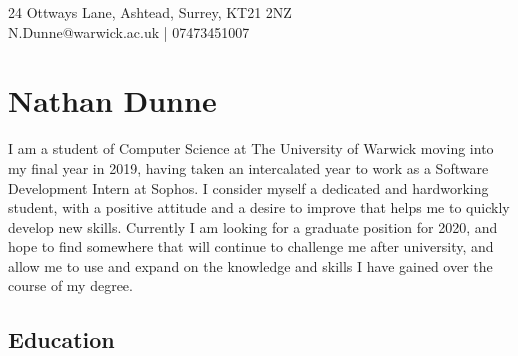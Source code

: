 \documentclass[11pt]{article}
\newcommand{\linesep}{\noindent\makebox[\linewidth]{\rule{\linewidth}{0.2pt}}}
\begin{document}
\hspace*{\fill} 24 Ottways Lane, Ashtead, Surrey, KT21 2NZ \\
\hspace*{\fill} N.Dunne@warwick.ac.uk | 07473451007
\section*{Nathan Dunne}

I am a student of Computer Science at The University of Warwick moving into my final year in 2019, having taken an intercalated year to work as a Software Development Intern at Sophos. I consider myself a dedicated and hardworking student, with a positive attitude and a desire to improve that helps me to quickly develop new skills. Currently I am looking for a graduate position for 2020, and hope to find somewhere that will continue to challenge me after university, and allow me to use and expand on the knowledge and skills I have gained over the course of my degree.

\linesep
\subsection*{Education}

\end{document}
